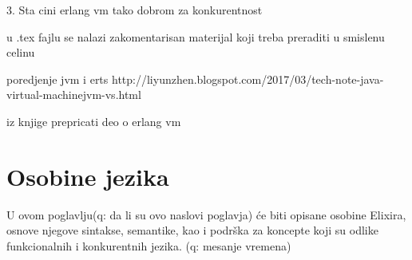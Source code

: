 \documentclass[a4paper]{article}
\begin{document}
3. Sta cini erlang vm tako dobrom za konkurentnost

u .tex fajlu se nalazi zakomentarisan materijal koji treba preraditi u smislenu celinu

poredjenje jvm i erts http://liyunzhen.blogspot.com/2017/03/tech-note-java-virtual-machinejvm-vs.html

iz knjige prepricati deo o erlang vm








\section{Osobine jezika}
U ovom poglavlju(q: da li su ovo naslovi poglavja) će biti opisane osobine Elixira, osnove njegove sintakse, semantike, kao i podrška za koncepte koji su odlike funkcionalnih i konkurentnih jezika. (q: mesanje vremena) 
\end{document}
